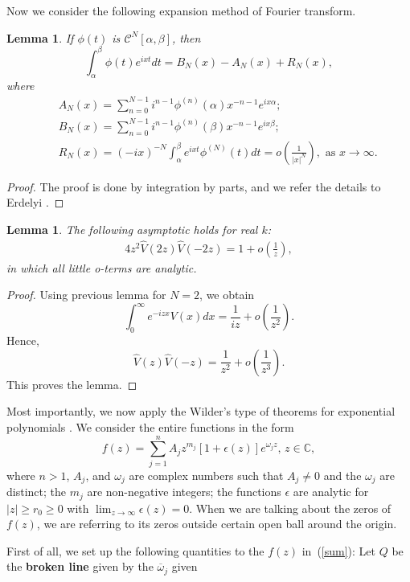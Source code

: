 \documentclass[10pt,a4paper]{article}
\theoremstyle{plain}
\newtheorem{lemma}[theorem]{Lemma}
\theoremstyle{definition}
\theoremstyle{remark}
\numberwithin{equation}{section}
\begin{document}
Now we consider the following expansion method of Fourier transform.
\begin{lemma}\label{2100}
If $\phi(t)$ is $\mathcal{C}^{N}[\alpha,\beta]$, then
$$\int_{\alpha}^{\beta}\phi(t)e^{ixt}dt=B_{N}(x)-A_{N}(x)+R_{N}(x),$$
where 
\begin{eqnarray*}
&&A_{N}(x)=\sum_{n=0}^{N-1}i^{n-1}\phi^{(n)}(\alpha)x^{{-n-1}}e^{ix\alpha};\nonumber\\
&&B_{N}(x)=\sum_{n=0}^{N-1}i^{n-1}\phi^{(n)}(\beta)x^{{-n-1}}e^{ix\beta};\nonumber\\
&&R_{N}(x)=(-ix)^{{-N}}\int_{\alpha}^{\beta}e^{ixt}\phi^{(N)}(t)dt=o(\frac{1}{|x|^{N}}),\mbox{ as }x\rightarrow\infty.
\end{eqnarray*}
\end{lemma}
\begin{proof}
The proof is done by integration by parts, and we refer the details to Erdelyi \cite[p.\,47]{Erdelyi}.
\end{proof}
\begin{lemma}
The following asymptotic holds for real $k$:
\begin{eqnarray}\label{VV}
4z^{2}\hat{V}(2z)\hat{V}(-2z)=1+o(\frac{1}{z}),
\end{eqnarray}
in which all little o-terms are analytic.
\end{lemma}
\begin{proof}
Using previous lemma for $N=2$, we obtain $$\int_{0}^{\infty}e^{-izx}V(x)dx=\frac{1}{iz}+o(\frac{1}{z^{2}}).$$
Hence, $$\hat{V}(z)\hat{V}(-z)=\frac{1}{z^{2}}+o(\frac{1}{z^{3}}).$$
This proves the lemma.
\end{proof}
Most importantly, we now apply the Wilder's type of theorems for
exponential polynomials
\cite{Dickson,Dickson2,Levin}. 
We consider the entire functions in the form
\begin{equation}\label{sum}
f(z)=\sum_{j=1}^nA_jz^{m_j}[1+\epsilon(z)]e^{\omega_jz},\,z\in\mathbb{C},
\end{equation}
where $n>1$, $A_j$, and $\omega_j$ are complex numbers such that
$A_j\neq0$ and the $\omega_j$ are distinct; the $m_j$ are
non-negative integers; the functions $\epsilon$ are analytic for
$|z|\geq r_0\geq0$ with $\lim_{z\rightarrow\infty}\epsilon(z)=0$.
When we are talking about the zeros of $f(z)$, we are referring to
its zeros outside certain open ball around the origin.
\par
First of all, we set up
the following quantities to the $f(z)$ in~(\ref{sum}): Let $Q$ be
the \textbf{broken line} given by the $\overline{\omega}_j$ given
\end{document}
